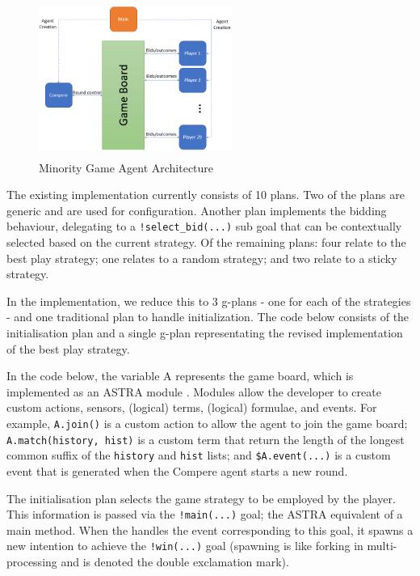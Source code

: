 \begin{figure}[!tbh]
\centering
\includegraphics[height=2in, width=2.5in]{mg.png}
\caption{Minority Game Agent Architecture}
\label{fig:mgagents}
\end{figure}

The existing implementation currently consists of 10 plans. Two of the plans are generic and are
used for configuration. Another plan implements the bidding behaviour, delegating to a 
\verb|!select_bid(...)| sub goal that can be contextually selected based on the current strategy.
Of the remaining plans: four relate to the best play strategy; one relates to a random strategy;
and two relate to a sticky strategy.


In the {\aser} implementation, we reduce this to 3 g-plans - one for each of the strategies - 
and one traditional plan to handle initialization. The code below consists of the initialisation 
plan and a single g-plan representating the revised implementation of the best play strategy.

In the code below, the variable A represents the game board, which is implemented as an ASTRA module 
\cite{DBLP:conf/prima/CollierRL15}. Modules allow the developer to create custom actions, 
sensors, (logical) terms, (logical) formulae, and events. For example, \verb|A.join()| is a 
custom action to allow the agent to join the game board; \verb|A.match(history, hist)| is a 
custom term that return the length of the longest common suffix of the \verb|history| and 
\verb|hist| lists; and \verb|$A.event(...)| is a custom event that is generated when the 
Compere agent starts a new round.

The initialisation plan selects the game strategy to be employed by the player. This information
 is passed via the \verb|!main(...)| goal; the ASTRA equivalent of a main method. When the handles
the event corresponding to this goal, it spawns a new intention to achieve the \verb|!win(...)| 
goal (spawning is like forking in multi-processing and is denoted the double exclamation mark).

